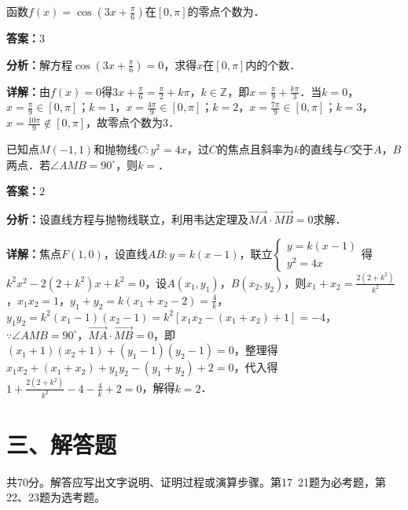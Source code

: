 \begin{question}[points=5]
函数$f(x)=\cos(3x+\frac{\pi}{6})$在$[0,\pi]$的零点个数为．
\fillin[{$3$}]
\begin{solution}
\textbf{答案：}$3$

\textbf{分析：}解方程$\cos(3x+\frac{\pi}{6})=0$，求得$x$在$[0,\pi]$内的个数．

\textbf{详解：}由$f(x)=0$得$3x+\frac{\pi}{6}=\frac{\pi}{2}+k\pi$，$k\in\mathbb{Z}$，即$x=\frac{\pi}{9}+\frac{k\pi}{3}$．当$k=0$，$x=\frac{\pi}{9}\in[0,\pi]$；$k=1$，$x=\frac{4\pi}{9}\in[0,\pi]$；$k=2$，$x=\frac{7\pi}{9}\in[0,\pi]$；$k=3$，$x=\frac{10\pi}{9}\notin[0,\pi]$，故零点个数为3．
\end{solution}
\end{question}

\begin{question}[points=5]
已知点$M(-1,1)$和抛物线$C:y^2=4x$，过$C$的焦点且斜率为$k$的直线与$C$交于$A$，$B$两点．若$\angle AMB=90^\circ$，则$k=$．
\fillin[{$2$}]
\begin{solution}
\textbf{答案：}$2$

\textbf{分析：}设直线方程与抛物线联立，利用韦达定理及$\overrightarrow{MA}\cdot\overrightarrow{MB}=0$求解．

\textbf{详解：}焦点$F(1,0)$，设直线$AB:y=k(x-1)$，联立$\begin{cases}y=k(x-1)\\y^2=4x\end{cases}$得$k^2x^2-2(2+k^2)x+k^2=0$，设$A(x_1,y_1)$，$B(x_2,y_2)$，则$x_1+x_2=\frac{2(2+k^2)}{k^2}$，$x_1x_2=1$，$y_1+y_2=k(x_1+x_2-2)=\frac{4}{k}$，$y_1y_2=k^2(x_1-1)(x_2-1)=k^2[x_1x_2-(x_1+x_2)+1]=-4$，$\because \angle AMB=90^\circ$，$\overrightarrow{MA}\cdot\overrightarrow{MB}=0$，即$(x_1+1)(x_2+1)+(y_1-1)(y_2-1)=0$，整理得$x_1x_2+(x_1+x_2)+y_1y_2-(y_1+y_2)+2=0$，代入得$1+\frac{2(2+k^2)}{k^2}-4-\frac{4}{k}+2=0$，解得$k=2$．
\end{solution}
\end{question}

\section*{三、解答题}
共70分。解答应写出文字说明、证明过程或演算步骤。第17~21题为必考题，第22、23题为选考题。

